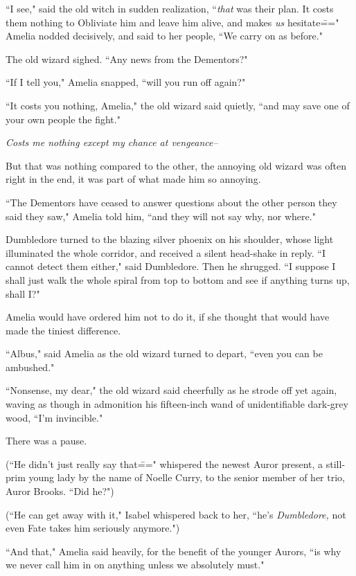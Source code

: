 ``I see," said the old witch in sudden realization, ``\emph{that} was their plan. It costs them nothing to Obliviate him and leave him alive, and makes \emph{us} hesitate\===" Amelia nodded decisively, and said to her people, ``We carry on as before."

The old wizard sighed. ``Any news from the Dementors?"

``If I tell you," Amelia snapped, ``will you run off again?"

``It costs you nothing, Amelia," the old wizard said quietly, ``and may save one of your own people the fight."

\emph{Costs me nothing except my chance at vengeance\---}

But that was nothing compared to the other, the annoying old wizard was often right in the end, it was part of what made him so annoying.

``The Dementors have ceased to answer questions about the other person they said they saw," Amelia told him, ``and they will not say why, nor where."

Dumbledore turned to the blazing silver phoenix on his shoulder, whose light illuminated the whole corridor, and received a silent head-shake in reply. ``I cannot detect them either," said Dumbledore. Then he shrugged. ``I suppose I shall just walk the whole spiral from top to bottom and see if anything turns up, shall I?"

Amelia would have ordered him not to do it, if she thought that would have made the tiniest difference.

``Albus," said Amelia as the old wizard turned to depart, ``even you can be ambushed."

``Nonsense, my dear," the old wizard said cheerfully as he strode off yet again, waving as though in admonition his fifteen-inch wand of unidentifiable dark-grey wood, ``I'm invincible."

There was a pause.

(``He didn't just really say that\===" whispered the newest Auror present, a still-prim young lady by the name of Noelle Curry, to the senior member of her trio, Auror Brooks. ``Did he?")

(``He can get away with it," Isabel whispered back to her, ``he's \emph{Dumbledore,} not even Fate takes him seriously anymore.")

``And that," Amelia said heavily, for the benefit of the younger Aurors, ``is why we never call him in on anything unless we absolutely must."

